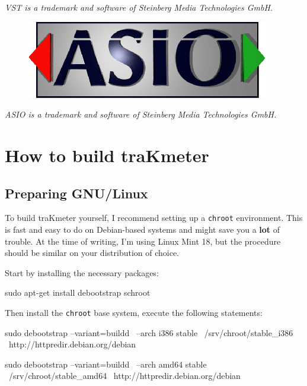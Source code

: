 \emph{VST is a trademark and software of Steinberg Media Technologies
  GmbH.}

\begin{figure}
  \includegraphics[scale=0.60,clip]{include/images/trademark_asio.png}
\end{figure}

\emph{ASIO is a trademark and software of Steinberg Media Technologies
  GmbH.}

\appendix

\chapter{How to build traKmeter}
\label{chap:build_trakmeter}

\section{Preparing GNU/Linux}

To build traKmeter yourself, I recommend setting up a \texttt{chroot}
environment.  This is fast and easy to do on Debian-based systems and
might save you a \textbf{lot} of trouble.  At the time of writing, I'm
using Linux Mint 18, but the procedure should be similar on your
distribution of choice.

Start by installing the necessary packages:

\begin{VerbatimBoth}
  sudo apt-get install debootstrap schroot
\end{VerbatimBoth}

Then install the \texttt{chroot} base system, execute the following
statements:

\begin{Verbatim32}
  sudo debootstrap --variant=buildd \
    --arch i386 stable \
    /srv/chroot/stable_i386 \
    http://httpredir.debian.org/debian
\end{Verbatim32}

\begin{Verbatim64}
  sudo debootstrap --variant=buildd \
    --arch amd64 stable \
    /srv/chroot/stable_amd64 \
    http://httpredir.debian.org/debian
\end{Verbatim64}

